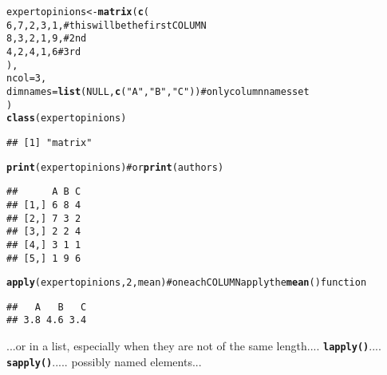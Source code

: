 \documentclass[11pt]{article}\usepackage{graphicx, color}
\makeatletter
\newcommand{\hlfunctioncall}[1]{\textcolor[rgb]{0.501960784313725,0,0.329411764705882}{\textbf{#1}}}%
\newcommand{\hlstring}[1]{\textcolor[rgb]{0.6,0.6,1}{#1}}%
\newcommand{\hlcomment}[1]{\textcolor[rgb]{0.180392156862745,0.6,0.341176470588235}{#1}}%
\newenvironment{kframe}{%
 \def\at@end@of@kframe{}%
 \ifinner\ifhmode%
  \def\at@end@of@kframe{\end{minipage}}%
  \begin{minipage}{\columnwidth}%
 \fi\fi%
 \def\FrameCommand##1{\hskip\@totalleftmargin \hskip-\fboxsep
 \colorbox{shadecolor}{##1}\hskip-\fboxsep
     \hskip-\linewidth \hskip-\@totalleftmargin \hskip\columnwidth}%
 \MakeFramed {\advance\hsize-\width
   \@totalleftmargin\z@ \linewidth\hsize
   \@setminipage}}%
 {\par\unskip\endMakeFramed%
 \at@end@of@kframe}
\newenvironment{knitrout}{}{} %
\newcommand{\Rfunc}[1]{\texttt{\hlfunctioncall{#1}}}
\theoremstyle{remark}
\theoremstyle{definition}
\makeatother
\begin{document}
\begin{knitrout}\small
{}\color{fgcolor}\begin{kframe}
\begin{alltt}
expertopinions <- \hlfunctioncall{matrix}(\hlfunctioncall{c}(
      6,7,2,3,1, \hlcomment{# this will be the first COLUMN}
      8,3,2,1,9, \hlcomment{# 2nd}
      4,2,4,1,6  \hlcomment{# 3rd}
   ),
   ncol=3,
   dimnames=\hlfunctioncall{list}(NULL, \hlfunctioncall{c}(\hlstring{"A"}, \hlstring{"B"}, \hlstring{"C"})) # only column names set
)
\hlfunctioncall{class}(expertopinions)
\end{alltt}
\begin{verbatim}
## [1] "matrix"
\end{verbatim}
\begin{alltt}
\hlfunctioncall{print}(expertopinions)   \hlcomment{# or \hlfunctioncall{print}(authors)}
\end{alltt}
\begin{verbatim}
##      A B C
## [1,] 6 8 4
## [2,] 7 3 2
## [3,] 2 2 4
## [4,] 3 1 1
## [5,] 1 9 6
\end{verbatim}
\begin{alltt}
\hlfunctioncall{apply}(expertopinions, 2, mean) \hlcomment{# on each COLUMN apply the \hlfunctioncall{mean}() function}
\end{alltt}
\begin{verbatim}
##   A   B   C 
## 3.8 4.6 3.4
\end{verbatim}
\end{kframe}
\end{knitrout}


...or in a list, especially when they are not of the same length....
\Rfunc{lapply()}.... \Rfunc{sapply()}..... possibly named elements...
\end{document}
